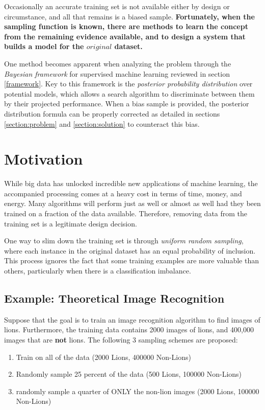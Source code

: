 \documentclass[twoside]{article}
\begin{document}
Occasionally an accurate training set is not available either by design or circumstance, and all that remains is a biased sample. \textbf{Fortunately, when the sampling function is known, there are methods to learn the concept from the remaining evidence available, and to design a system that builds a model for the \(original\) dataset.}

One method becomes apparent when analyzing the problem through the \textit{Bayesian framework} for supervised machine learning reviewed in section \ref{framework}. Key to this framework is the \textit{posterior probability distribution} over potential models, which allows a search algorithm to discriminate between them by their projected performance. When a bias sample is provided, the posterior distribution formula can be properly corrected as detailed in sections \ref{section:problem} and \ref{section:solution} to counteract this bias.

\section{Motivation}

While big data has unlocked incredible new applications of machine learning, the accompanied processing comes at a heavy cost in terms of time, money, and energy. Many algorithms will perform just as well or almost as well had they been trained on a fraction of the data available. Therefore, removing data from the training set is a legitimate design decision.

One way to slim down the training set is through \textit{uniform random sampling}, where each instance in the original dataset has an equal probability of inclusion. This process ignores the fact that some training examples are more valuable than others, particularly when there is a classification imbalance.

\subsection{Example: Theoretical Image Recognition}
\label{section:lion}

Suppose that the goal is to train an image recognition algorithm to find images of lions. Furthermore, the training data contains 2000 images of lions, and 400,000 images that are \textbf{not} lions. The following 3 sampling schemes are proposed:

\begin{enumerate}[label=(\Alph*)]
\item Train on all of the data (2000 Lions, 400000 Non-Lions)
\item Randomly sample 25 percent of the data (500 Lions, 100000 Non-Lions)
\item  randomly sample a quarter of ONLY the non-lion images (2000 Lions, 100000 Non-Lions)
\end{enumerate}
\end{document}
